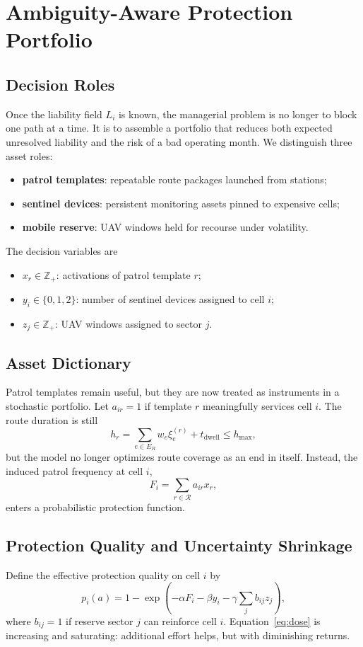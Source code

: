 \section{Ambiguity-Aware Protection Portfolio}
\subsection{Decision Roles}
Once the liability field \(L_i\) is known, the managerial problem is no longer to block one path at a time. It is to assemble a portfolio that reduces both expected unresolved liability and the risk of a bad operating month. We distinguish three asset roles:
\begin{itemize}
  \item \textbf{patrol templates}: repeatable route packages launched from stations;
  \item \textbf{sentinel devices}: persistent monitoring assets pinned to expensive cells;
  \item \textbf{mobile reserve}: UAV windows held for recourse under volatility.
\end{itemize}
The decision variables are
\begin{itemize}
  \item \(x_r\in\mathbb{Z}_+\): activations of patrol template \(r\);
  \item \(y_i\in\{0,1,2\}\): number of sentinel devices assigned to cell \(i\);
  \item \(z_j\in\mathbb{Z}_+\): UAV windows assigned to sector \(j\).
\end{itemize}

\subsection{Asset Dictionary}
Patrol templates remain useful, but they are now treated as instruments in a stochastic portfolio. Let \(a_{ir}=1\) if template \(r\) meaningfully services cell \(i\). The route duration is still
\begin{equation}
h_r = \sum_{e\in E_R} w_e \xi_e^{(r)} + t_{\mathrm{dwell}} \le h_{\max},
\label{eq:route}
\end{equation}
but the model no longer optimizes route coverage as an end in itself. Instead, the induced patrol frequency at cell \(i\),
\[
F_i=\sum_{r\in\mathcal{R}} a_{ir}x_r,
\]
enters a probabilistic protection function.

\subsection{Protection Quality and Uncertainty Shrinkage}
Define the effective protection quality on cell \(i\) by
\begin{equation}
p_i(a)
=
1-\exp\!\left(
-\alpha F_i
-\beta y_i
-\gamma\sum_j b_{ij}z_j
\right),
\label{eq:dose}
\end{equation}
where \(b_{ij}=1\) if reserve sector \(j\) can reinforce cell \(i\). Equation~\eqref{eq:dose} is increasing and saturating: additional effort helps, but with diminishing returns.

